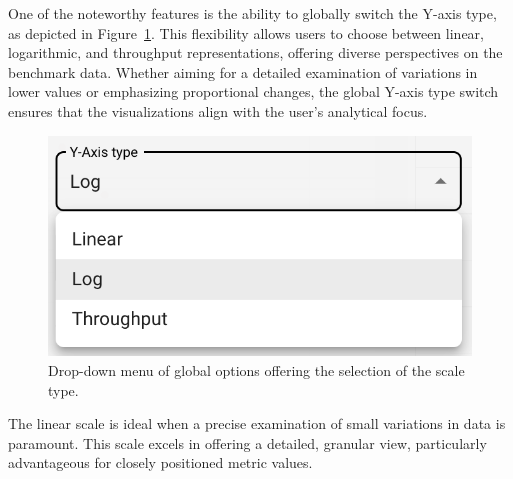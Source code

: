 One of the noteworthy features is the ability to globally switch the Y-axis type, as depicted in Figure~\ref{fig:chart-configuration-scale}. This flexibility allows users to choose between linear, logarithmic, and throughput representations, offering diverse perspectives on the benchmark data. Whether aiming for a detailed examination of variations in lower values or emphasizing proportional changes, the global Y-axis type switch ensures that the visualizations align with the user's analytical focus.

\begin{figure}[h]
  \centering
  \includegraphics[width=0.3\linewidth]{figures/chart-configuration-scale.png}
  \caption{Drop-down menu of global options offering the selection of the scale type.}
  \label{fig:chart-configuration-scale}
\end{figure}

The linear scale is ideal when a precise examination of small variations in data is paramount. This scale excels in offering a detailed, granular view, particularly advantageous for closely positioned metric values.

